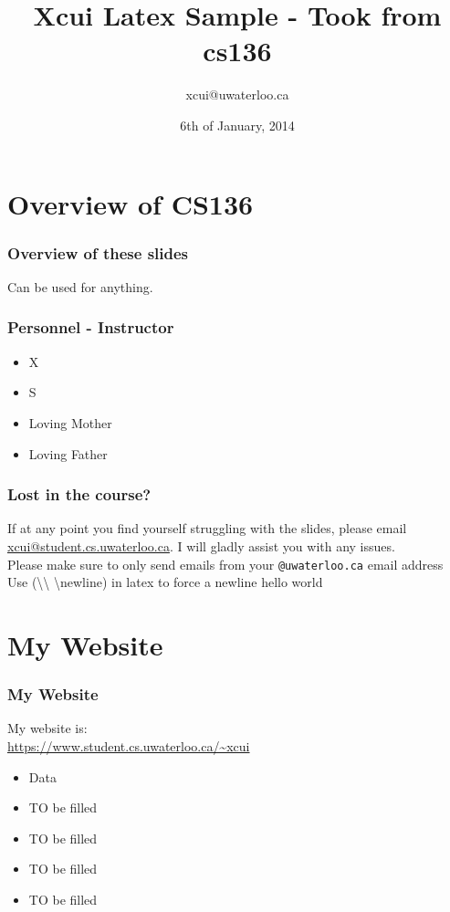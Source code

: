 \documentclass{beamer}
\begin{document}
\date{6th of January, 2014}
\title{Xcui Latex Sample - Took from cs136}
\author{xcui@uwaterloo.ca}

\frame{\titlepage}

\section*{Overview of CS136}
\begin{frame}
\frametitle{Overview of these slides}
Can be used for anything.
\end{frame}

\begin{frame}
\frametitle{Personnel - Instructor}
  \begin{itemize}
    \item X
    \item S
    \item Loving Mother
    \item Loving Father
  \end{itemize}
\end{frame}

\begin{frame}
\frametitle{Lost in the course?}  If at any point you find yourself struggling
with the slides, please email \url{xcui@student.cs.uwaterloo.ca}. I will gladly
assist you with any issues.\\ Please make sure to only send emails from your
\texttt{@uwaterloo.ca} email address\\ Use (\textbackslash\textbackslash \space
\textbar \space \textbackslash newline) in latex to force a newline \newline
hello world
\end{frame}


\section*{My Website}
\begin{frame}
\frametitle{My Website}
My website is:\\
\url{https://www.student.cs.uwaterloo.ca/~xcui}
\begin{itemize}
\item Data
\item TO be filled
\item TO be filled
\item TO be filled
\item TO be filled
\end{itemize}
\end{frame}
\end{document}
